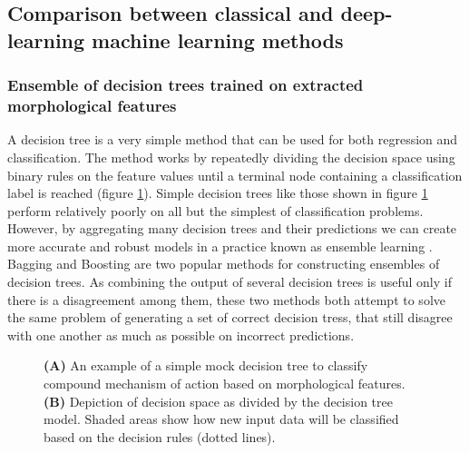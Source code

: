 \documentclass[a4paper,11pt,twoside,openright]{scrbook}
\begin{document}

\subsection{Comparison between classical and deep-learning machine learning methods}

\subsubsection{Ensemble of decision trees trained on extracted morphological features}
A decision tree is a very simple method that can be used for both regression and classification.
The method works by repeatedly dividing the decision space using binary rules on the feature values until a terminal node containing a classification label is reached (figure \ref{figure:decision_tree}).
Simple decision trees like those shown in figure \ref{figure:decision_tree} perform relatively poorly on all but the simplest of classification problems.
However, by aggregating many decision trees and their predictions we can create more accurate and robust models in a practice known as ensemble learning \cite{Opitz1999}.
Bagging \cite{Breiman1996} and Boosting \cite{Freund1996} are two popular methods for constructing ensembles of decision trees.
As combining the output of several decision trees is useful only if there is a disagreement among them, these two methods both attempt to solve the same problem of generating a set of correct decision tress, that still disagree with one another as much as possible on incorrect predictions.


\begin{figure}
    \captionsetup{width=0.8\textwidth}
    \caption[Diagram of a simple decision tree]{\textbf{(A)} An example of a simple mock decision tree to classify compound mechanism of action based on morphological features. \textbf{(B)} Depiction of decision space as divided by the decision tree model. Shaded areas show how new input data will be classified based on the decision rules (dotted lines).}
    
    \label{figure:decision_tree}
\end{figure}
\end{document}
